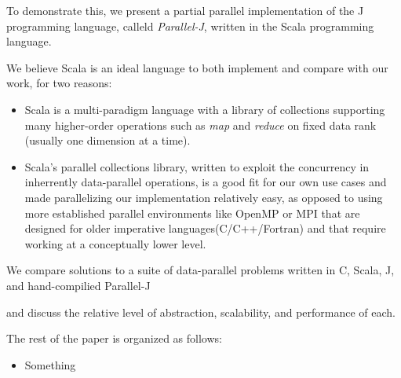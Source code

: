 To demonstrate this, we present a partial parallel implementation of the J programming language, calleld \textit{Parallel-J}, written in the Scala programming language.\begin{comment}TODO cite?\end{comment}
We believe Scala is an ideal language to both implement and compare with our work, for two reasons:
\begin{itemize}
    \item Scala is a multi-paradigm language with a library of collections supporting many higher-order operations such as \textit{map} and \textit{reduce} on fixed data rank (usually one dimension at a time).%
    \item Scala's parallel collections library\cite{pc}, written to exploit the concurrency in inherrently data-parallel operations, is a good fit for our own use cases and made parallelizing our implementation relatively easy, as opposed to using more established parallel environments like OpenMP or MPI that are designed for older imperative languages(C/C++/Fortran) and that require working at a conceptually lower level. %
\end{itemize}
We compare solutions to a suite of data-parallel problems written in C, Scala, J, and hand-compilied Parallel-J\begin{comment}TODO really should change name\end{comment} and discuss the relative level of abstraction, scalability, and performance of each.

The rest of the paper is organized as follows:
\begin{itemize}
	\item Something
\end{itemize}

\nocite{rankanduni}
\nocite{dph}

